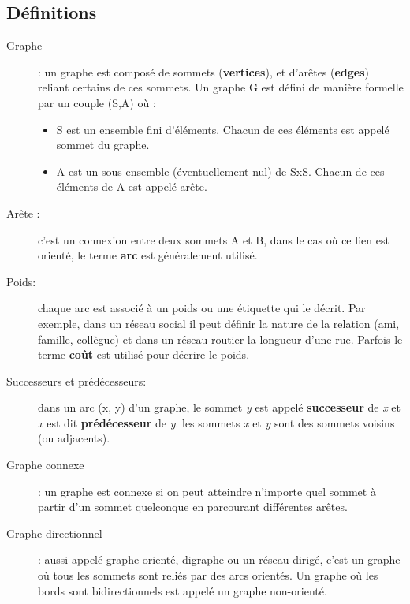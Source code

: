 \subsection{Définitions}
\begin{description}
\item[Graphe]: un graphe est composé de sommets (\textbf{vertices}), et d'arêtes (\textbf{edges}) reliant certains de ces sommets.
Un graphe G est défini de manière formelle par un couple (S,A) où :
\begin{itemize}
	\item S est un ensemble fini d'éléments. Chacun de ces éléments est appelé sommet du graphe.
	\item A est un sous-ensemble (éventuellement nul) de SxS. Chacun de ces éléments de A est appelé arête.
\end{itemize}
\item[Arête :] c'est un connexion entre deux sommets A et B, dans le cas où ce lien est orienté, le terme \textbf{arc} est généralement utilisé.

\item[Poids:] chaque arc est associé à un poids ou une étiquette qui le décrit. Par exemple, dans un réseau social il peut définir la nature de la relation (ami, famille, collègue) et dans un réseau routier la longueur d'une rue. Parfois le terme \textbf{coût} est utilisé pour décrire le poids.

\item[Successeurs et prédécesseurs:] dans un arc (x, y) d'un graphe, le sommet \emph{y} est appelé \textbf{successeur} de \emph{x} et \emph{x} est dit \textbf{prédécesseur} de \emph{y}.\newline
les sommets \emph{x} et \emph{y} sont des sommets voisins (ou adjacents).

\item[Graphe connexe] : un graphe est connexe si on peut atteindre n'importe quel sommet à partir d'un sommet quelconque en parcourant différentes arêtes.

\item[Graphe directionnel] : aussi appelé graphe orienté, digraphe ou un réseau dirigé, c'est un graphe où tous les sommets sont reliés par des arcs orientés.
Un graphe où les bords sont bidirectionnels est appelé un graphe non-orienté.


\end{description}
